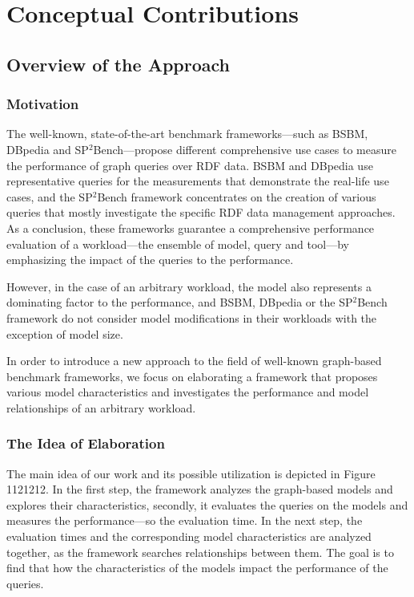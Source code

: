 \chapter{Conceptual Contributions}

\section{Overview of the Approach}

\subsection{Motivation}

The well-known, state-of-the-art benchmark frameworks---such as BSBM, DBpedia and SP$^2$Bench---propose different comprehensive use cases to measure the performance of graph queries over RDF data. BSBM and DBpedia use representative queries for the measurements that demonstrate the real-life use cases, and the SP$^2$Bench framework concentrates on the creation of various queries that mostly investigate the specific RDF data management approaches. As a conclusion, these frameworks guarantee a comprehensive performance evaluation of a workload---the ensemble of model, query and tool---by emphasizing the impact of the queries to the performance.

However, in the case of an arbitrary workload, the model also represents a dominating factor to the performance, and BSBM, DBpedia or the SP$^2$Bench framework do not consider model modifications in their workloads with the exception of model size.

In order to introduce a new approach to the field of well-known graph-based benchmark frameworks, we focus on elaborating a framework that proposes various model characteristics and investigates the performance and model relationships of an arbitrary workload.

\subsection{The Idea of Elaboration}
The main idea of our work and its possible utilization is depicted in Figure 1121212. %
In the first step, the framework analyzes the graph-based models and explores their characteristics, secondly, it evaluates the queries on the models and measures the performance---so the evaluation time. In the next step, the evaluation times and the corresponding model characteristics are analyzed together, as the framework searches relationships between them. The goal is to find that how the characteristics of the models impact the performance of the queries.

